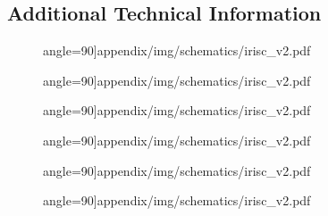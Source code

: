 \newpage
\begin{landscape}
\section{Additional Technical Information}\label{sec:appC}

\begin{figure}[h!]
	 angle=90]{appendix/img/schematics/irisc_v2.pdf}
\end{figure}
\newpage
\begin{figure}[h!]
		 angle=90]{appendix/img/schematics/irisc_v2.pdf}
\end{figure}
\newpage
\begin{figure}[h!]
		 angle=90]{appendix/img/schematics/irisc_v2.pdf}
\end{figure}
\newpage
\begin{figure}[h!]
		 angle=90]{appendix/img/schematics/irisc_v2.pdf}
\end{figure}
\newpage
\begin{figure}[h!]
		 angle=90]{appendix/img/schematics/irisc_v2.pdf}
\end{figure}
\newpage
\begin{figure}[h!]
		 angle=90]{appendix/img/schematics/irisc_v2.pdf}
\end{figure}
\end{landscape}




% 

% 
% 
% 




% 

